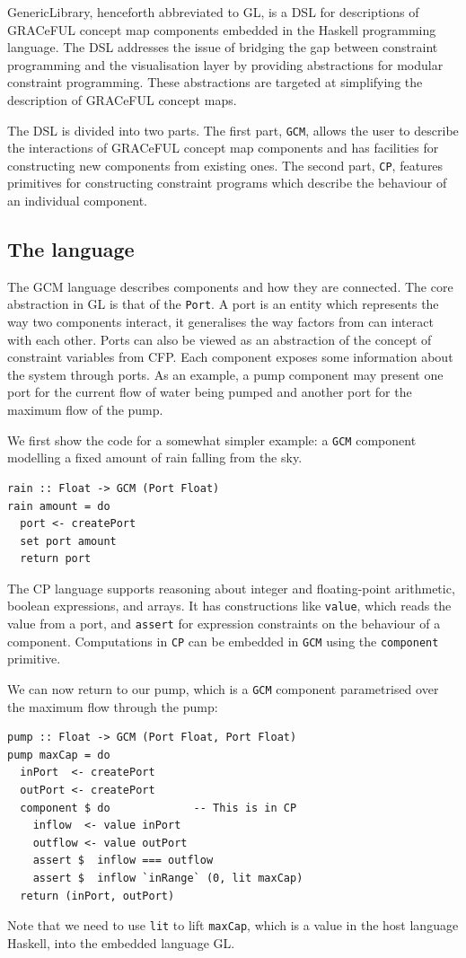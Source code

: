 GenericLibrary, henceforth abbreviated to GL, is a DSL for
descriptions of GRACeFUL concept map components embedded in the
Haskell programming language.
%
The DSL addresses the issue of bridging the gap between constraint
programming and the visualisation layer by providing abstractions for
modular constraint programming.
%
These abstractions are targeted at simplifying the description of
GRACeFUL concept maps.

The DSL is divided into two parts.
%
The first part, \texttt{GCM}, allows the user to describe the
interactions of GRACeFUL concept map components and has facilities for
constructing new components from existing ones.
%
The second part, \texttt{CP}, features primitives for constructing
constraint programs which describe the behaviour of an individual
component.

\subsection{The language}

The GCM language describes components and how they are connected.
%
The core abstraction in GL is that of the \texttt{Port}.
%
A port is an entity which represents the way two components interact,
it generalises the way factors from \cite{D4.1} can interact with each
other.
%
Ports can also be viewed as an abstraction of the concept of constraint
variables from CFP.
%
Each component exposes some information about the system through
ports.
%
As an example, a pump component may present one port for the current
flow of water being pumped and another port for the maximum flow of
the pump.

We first show the code for a somewhat simpler example: a \texttt{GCM}
component modelling a fixed amount of rain falling from the sky.
\begin{verbatim}
rain :: Float -> GCM (Port Float)
rain amount = do
  port <- createPort
  set port amount
  return port
\end{verbatim}

The CP language supports reasoning about integer and floating-point
arithmetic, boolean expressions, and arrays.
%
It has constructions like \texttt{value}, which reads the value from a
port, and \texttt{assert} for expression constraints on the behaviour
of a component.
%
Computations in \texttt{CP} can be embedded in \texttt{GCM} using the
\texttt{component} primitive.

We can now return to our pump, which is a \texttt{GCM} component
parametrised over the maximum flow through the pump:
%
\begin{verbatim}
pump :: Float -> GCM (Port Float, Port Float)
pump maxCap = do
  inPort  <- createPort
  outPort <- createPort
  component $ do             -- This is in CP
    inflow  <- value inPort
    outflow <- value outPort
    assert $  inflow === outflow
    assert $  inflow `inRange` (0, lit maxCap)
  return (inPort, outPort)
\end{verbatim}
%
Note that we need to use \texttt{lit} to lift \texttt{maxCap}, which
is a value in the host language Haskell, into the embedded language
GL.

